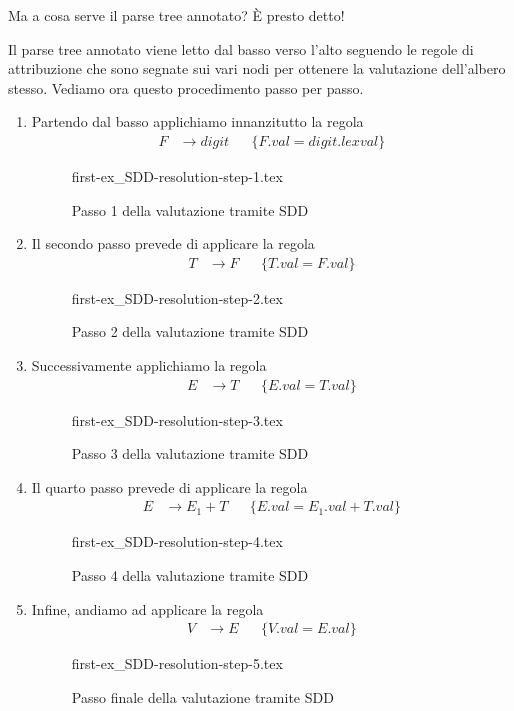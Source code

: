 \documentclass[class=book, crop=false, oneside, 12pt]{standalone}
\begin{document}
Ma a cosa serve il parse tree annotato? È presto detto!

\noindent Il parse tree annotato viene letto dal basso verso l'alto seguendo le regole di attribuzione che sono segnate sui vari nodi per ottenere la valutazione dell'albero stesso. Vediamo ora questo procedimento passo per passo.

\begin{enumerate}
    \item Partendo dal basso applichiamo innanzitutto la regola
    \begin{align*}
        F &\to digit & &\{F.val = digit.lexval\}
    \end{align*}
    \begin{figure}[H]
        \centering
        {first-ex_SDD-resolution-step-1.tex}
        \caption{Passo 1 della valutazione tramite SDD}
    \end{figure}
    \item Il secondo passo prevede di applicare la regola
    \begin{align*}
        T &\to F & &\{T.val = F.val\}
    \end{align*}
    \begin{figure}[H]
        \centering
        {first-ex_SDD-resolution-step-2.tex}
        \caption{Passo 2 della valutazione tramite SDD}
    \end{figure}
    \item Successivamente applichiamo la regola
    \begin{align*}
        E &\to T & &\{E.val = T.val\}
    \end{align*}
    \begin{figure}[H]
        \centering
        {first-ex_SDD-resolution-step-3.tex}
        \caption{Passo 3 della valutazione tramite SDD}
    \end{figure}
    \item Il quarto passo prevede di applicare la regola
    \begin{align*}
        E &\to E_1 + T & &\{E.val = E_1.val + T.val\}
    \end{align*}
    \begin{figure}[H]
        \centering
        {first-ex_SDD-resolution-step-4.tex}
        \caption{Passo 4 della valutazione tramite SDD}
    \end{figure}
    \item Infine, andiamo ad applicare la regola
    \begin{align*}
        V &\to E & &\{V.val = E.val\}
    \end{align*}
    \begin{figure}[H]
        \centering
        {first-ex_SDD-resolution-step-5.tex}
        \caption{Passo finale della valutazione tramite SDD}
    \end{figure}
\end{enumerate}
\end{document}
